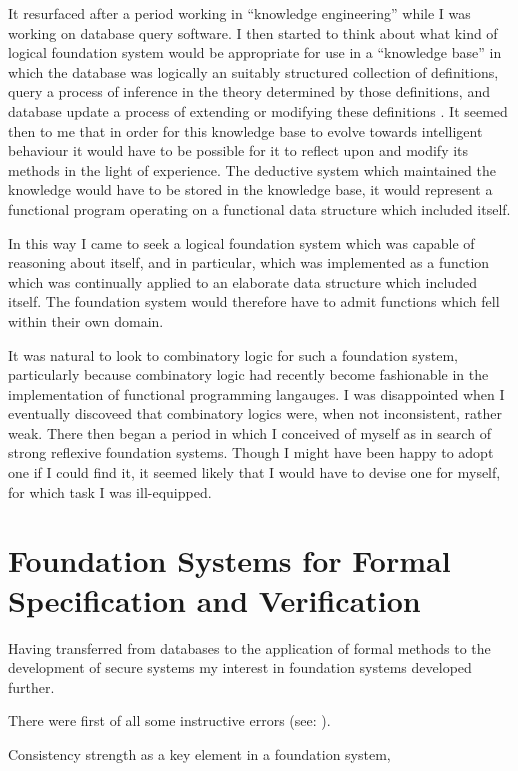 \documentclass[10pt,titlepage]{book}
\begin{document}
It resurfaced after a period working in ``knowledge engineering'' \cite{jones82} while I was working on database query software.
I then started to think about what kind of logical foundation system would be appropriate for use in a ``knowledge base'' in which the database was logically an suitably structured collection of definitions, query a process of inference in the theory determined by those definitions, and database update a process of extending or modifying these definitions \cite{jones85}.
It seemed then to me that in order for this knowledge base to evolve towards intelligent behaviour it would have to be possible for it to reflect upon and modify its methods in the light of experience.
The deductive system which maintained the knowledge would have to be stored in the knowledge base, it would represent a functional program operating on a functional data structure which included itself.

In this way I came to seek a logical foundation system which was capable of reasoning about itself, and in particular, which was implemented as a function which was continually applied to an elaborate data structure which included itself.
The foundation system would therefore have to admit functions which fell within their own domain.

It was natural to look to combinatory logic for such a foundation system, particularly because combinatory logic had recently become fashionable in the implementation of functional programming langauges.
I was disappointed when I eventually discoveed that combinatory logics were, when not inconsistent, rather weak.
There then began a period in which I conceived of myself as in search of strong reflexive foundation systems.
Though I might have been happy to adopt one if I could find it, it seemed likely that I would have to devise one for myself, for which task I was ill-equipped. 

\section{Foundation Systems for Formal Specification and Verification}

Having transferred from databases to the application of formal methods to the development of secure systems my interest in foundation systems developed further.

There were first of all some instructive errors (see: \cite{jones86a,jones86b}).

Consistency strength as a key element in a foundation system,
\end{document}
